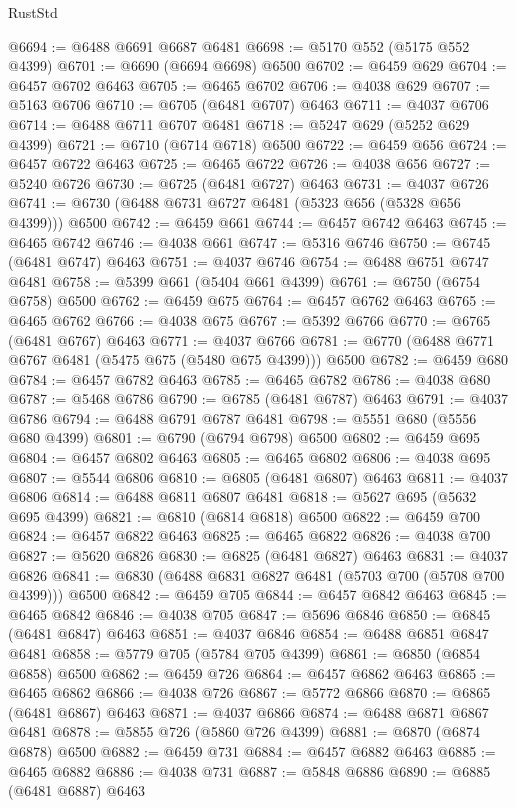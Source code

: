 \begin{lexlean}{RustStd}
\begin{coremodule}
@6694 := @6488 @6691 @6687 @6481
@6698 := @5170 @552 (@5175 @552 @4399)
@6701 := @6690 (@6694 @6698) @6500
@6702 := @6459 @629
@6704 := @6457 @6702 @6463
@6705 := @6465 @6702
@6706 := @4038 @629
@6707 := @5163 @6706
@6710 := @6705 (@6481 @6707) @6463
@6711 := @4037 @6706
@6714 := @6488 @6711 @6707 @6481
@6718 := @5247 @629 (@5252 @629 @4399)
@6721 := @6710 (@6714 @6718) @6500
@6722 := @6459 @656
@6724 := @6457 @6722 @6463
@6725 := @6465 @6722
@6726 := @4038 @656
@6727 := @5240 @6726
@6730 := @6725 (@6481 @6727) @6463
@6731 := @4037 @6726
@6741 := @6730 (@6488 @6731 @6727 @6481 (@5323 @656 (@5328 @656 @4399))) @6500
@6742 := @6459 @661
@6744 := @6457 @6742 @6463
@6745 := @6465 @6742
@6746 := @4038 @661
@6747 := @5316 @6746
@6750 := @6745 (@6481 @6747) @6463
@6751 := @4037 @6746
@6754 := @6488 @6751 @6747 @6481
@6758 := @5399 @661 (@5404 @661 @4399)
@6761 := @6750 (@6754 @6758) @6500
@6762 := @6459 @675
@6764 := @6457 @6762 @6463
@6765 := @6465 @6762
@6766 := @4038 @675
@6767 := @5392 @6766
@6770 := @6765 (@6481 @6767) @6463
@6771 := @4037 @6766
@6781 := @6770 (@6488 @6771 @6767 @6481 (@5475 @675 (@5480 @675 @4399))) @6500
@6782 := @6459 @680
@6784 := @6457 @6782 @6463
@6785 := @6465 @6782
@6786 := @4038 @680
@6787 := @5468 @6786
@6790 := @6785 (@6481 @6787) @6463
@6791 := @4037 @6786
@6794 := @6488 @6791 @6787 @6481
@6798 := @5551 @680 (@5556 @680 @4399)
@6801 := @6790 (@6794 @6798) @6500
@6802 := @6459 @695
@6804 := @6457 @6802 @6463
@6805 := @6465 @6802
@6806 := @4038 @695
@6807 := @5544 @6806
@6810 := @6805 (@6481 @6807) @6463
@6811 := @4037 @6806
@6814 := @6488 @6811 @6807 @6481
@6818 := @5627 @695 (@5632 @695 @4399)
@6821 := @6810 (@6814 @6818) @6500
@6822 := @6459 @700
@6824 := @6457 @6822 @6463
@6825 := @6465 @6822
@6826 := @4038 @700
@6827 := @5620 @6826
@6830 := @6825 (@6481 @6827) @6463
@6831 := @4037 @6826
@6841 := @6830 (@6488 @6831 @6827 @6481 (@5703 @700 (@5708 @700 @4399))) @6500
@6842 := @6459 @705
@6844 := @6457 @6842 @6463
@6845 := @6465 @6842
@6846 := @4038 @705
@6847 := @5696 @6846
@6850 := @6845 (@6481 @6847) @6463
@6851 := @4037 @6846
@6854 := @6488 @6851 @6847 @6481
@6858 := @5779 @705 (@5784 @705 @4399)
@6861 := @6850 (@6854 @6858) @6500
@6862 := @6459 @726
@6864 := @6457 @6862 @6463
@6865 := @6465 @6862
@6866 := @4038 @726
@6867 := @5772 @6866
@6870 := @6865 (@6481 @6867) @6463
@6871 := @4037 @6866
@6874 := @6488 @6871 @6867 @6481
@6878 := @5855 @726 (@5860 @726 @4399)
@6881 := @6870 (@6874 @6878) @6500
@6882 := @6459 @731
@6884 := @6457 @6882 @6463
@6885 := @6465 @6882
@6886 := @4038 @731
@6887 := @5848 @6886
@6890 := @6885 (@6481 @6887) @6463

\end{coremodule}
\end{lexlean}
